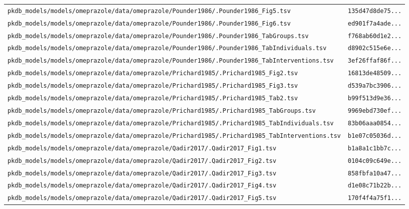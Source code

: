 \documentclass{article}
\begin{document}
\begin{longtable}{ll}
\texttt{pkdb\_models/models/omeprazole/data/omeprazole/Pounder1986/.Pounder1986\_Fig5.tsv} & \texttt{135d47d8de75...} \\
\texttt{pkdb\_models/models/omeprazole/data/omeprazole/Pounder1986/.Pounder1986\_Fig6.tsv} & \texttt{ed901f7a4ade...} \\
\texttt{pkdb\_models/models/omeprazole/data/omeprazole/Pounder1986/.Pounder1986\_TabGroups.tsv} & \texttt{f768ab60d1e2...} \\
\texttt{pkdb\_models/models/omeprazole/data/omeprazole/Pounder1986/.Pounder1986\_TabIndividuals.tsv} & \texttt{d8902c515e6e...} \\
\texttt{pkdb\_models/models/omeprazole/data/omeprazole/Pounder1986/.Pounder1986\_TabInterventions.tsv} & \texttt{3ef26ffaf86f...} \\
\texttt{pkdb\_models/models/omeprazole/data/omeprazole/Prichard1985/.Prichard1985\_Fig2.tsv} & \texttt{16813de48509...} \\
\texttt{pkdb\_models/models/omeprazole/data/omeprazole/Prichard1985/.Prichard1985\_Fig3.tsv} & \texttt{d539a7bc3906...} \\
\texttt{pkdb\_models/models/omeprazole/data/omeprazole/Prichard1985/.Prichard1985\_Tab2.tsv} & \texttt{b99f513d9e36...} \\
\texttt{pkdb\_models/models/omeprazole/data/omeprazole/Prichard1985/.Prichard1985\_TabGroups.tsv} & \texttt{9969ebd730ef...} \\
\texttt{pkdb\_models/models/omeprazole/data/omeprazole/Prichard1985/.Prichard1985\_TabIndividuals.tsv} & \texttt{83b06aaa0854...} \\
\texttt{pkdb\_models/models/omeprazole/data/omeprazole/Prichard1985/.Prichard1985\_TabInterventions.tsv} & \texttt{b1e07c05036d...} \\
\texttt{pkdb\_models/models/omeprazole/data/omeprazole/Qadir2017/.Qadir2017\_Fig1.tsv} & \texttt{b1a8a1c1bb7c...} \\
\texttt{pkdb\_models/models/omeprazole/data/omeprazole/Qadir2017/.Qadir2017\_Fig2.tsv} & \texttt{0104c09c649e...} \\
\texttt{pkdb\_models/models/omeprazole/data/omeprazole/Qadir2017/.Qadir2017\_Fig3.tsv} & \texttt{858fbfa10a47...} \\
\texttt{pkdb\_models/models/omeprazole/data/omeprazole/Qadir2017/.Qadir2017\_Fig4.tsv} & \texttt{d1e08c71b22b...} \\
\texttt{pkdb\_models/models/omeprazole/data/omeprazole/Qadir2017/.Qadir2017\_Fig5.tsv} & \texttt{170f4f4a75f1...} \\

\end{longtable}
\end{document}
